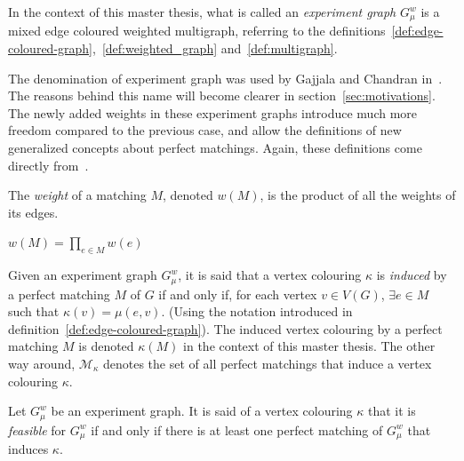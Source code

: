 \begin{definition}
    \label{def:experiment_graph}
    In the context of this master thesis, what is called an \textit{experiment graph} $G_\mu^w$ is a mixed edge coloured weighted multigraph, referring to the definitions~\ref{def:edge-coloured-graph},~\ref{def:weighted_graph} and~\ref{def:multigraph}.
\end{definition}

The denomination of experiment graph was used by Gajjala and Chandran in~\cite{chandran2023graphtheoretic}.
The reasons behind this name will become clearer in section~\ref{sec:motivations}.
The newly added weights in these experiment graphs introduce much more freedom compared to the previous case, and allow the definitions of new generalized concepts about perfect matchings.
Again, these definitions come directly from~\cite{wordpress}.

\begin{definition}
    \label{def:matching_weight}
    The \textit{weight} of a matching $M$, denoted $w(M)$, is the product of all the weights of its edges.
    \begin{center}
        $w(M) = \prod\limits_{e \in M}w(e)$
    \end{center}
\end{definition}

\begin{definition}
    \label{def:induced_vertex_colouring}
    Given an experiment graph $G_\mu^w$, it is said that a vertex colouring $\kappa$ is \textit{induced} by a perfect matching $M$ of $G$ if and only if, for each vertex $v \in V(G)$, $\exists e \in M$ such that $\kappa(v) = \mu(e, v)$.
    (Using the notation introduced in definition~\ref{def:edge-coloured-graph}).
    The induced vertex colouring by a perfect matching $M$ is denoted $\kappa(M)$ in the context of this master thesis.     %
    The other way around, $\mathcal{M}_\kappa$ denotes the set of all perfect matchings that induce a vertex colouring $\kappa$.
\end{definition}

\begin{definition}
    \label{def:feasible_vertex_colouring}
    Let $G_\mu^w$ be an experiment graph.
    It is said of a vertex colouring $\kappa$ that it is \textit{feasible} for $G_\mu^w$ if and only if there is at least one perfect matching of $G_\mu^w$ that induces $\kappa$.
\end{definition}


